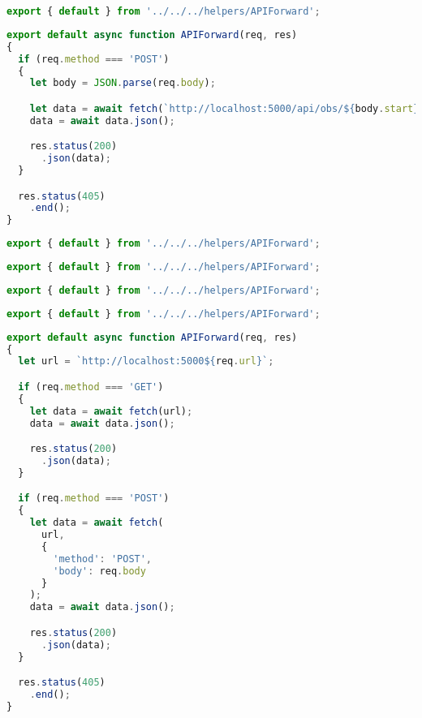 \documentclass[a4paper,12pt,twoside,openright,titlepage]{book}
\begin{document}
\begin{lstlisting}[title={raspberrypi/ui/pages/api/light/schedule.js}, language=JavaScript]
export { default } from '../../../helpers/APIForward';
\end{lstlisting}

\bigskip

\begin{lstlisting}[title={/raspberrypi/ui/pages/api/obs/getRange.js}, language=JavaScript]
export default async function APIForward(req, res)
{
  if (req.method === 'POST')
  {
    let body = JSON.parse(req.body);

    let data = await fetch(`http://localhost:5000/api/obs/${body.start}/${body.end}`);
    data = await data.json();

    res.status(200)
      .json(data);
  }

  res.status(405)
    .end();
}
\end{lstlisting}

\bigskip

\begin{lstlisting}[title={/raspberrypi/ui/pages/api/obs/lastDay.js}, language=JavaScript]
export { default } from '../../../helpers/APIForward';
\end{lstlisting}

\bigskip

\begin{lstlisting}[title={/raspberrypi/ui/pages/api/obs/newest.js}, language=JavaScript]
export { default } from '../../../helpers/APIForward';
\end{lstlisting}

\bigskip

\begin{lstlisting}[title={raspberrypi/ui/pages/api/pump/interval.js}, language=JavaScript]
export { default } from '../../../helpers/APIForward';
\end{lstlisting}

\bigskip

\begin{lstlisting}[title={raspberrypi/ui/pages/api/pump/schedule.js}, language=JavaScript]
export { default } from '../../../helpers/APIForward';
\end{lstlisting}

\bigskip

\begin{lstlisting}[title={raspberrypi/ui/helpers/APIForward.js}, language=JavaScript]
export default async function APIForward(req, res)
{
  let url = `http://localhost:5000${req.url}`;

  if (req.method === 'GET')
  {
    let data = await fetch(url);
    data = await data.json();

    res.status(200)
      .json(data);
  }

  if (req.method === 'POST')
  {
    let data = await fetch(
      url,
      {
        'method': 'POST',
        'body': req.body
      }
    );
    data = await data.json();

    res.status(200)
      .json(data);
  }

  res.status(405)
    .end();
}
\end{lstlisting}
\end{document}
